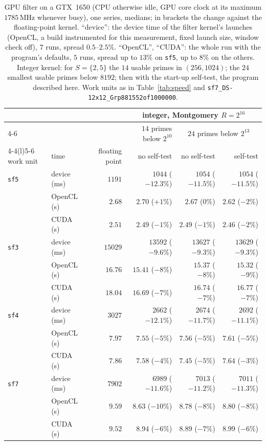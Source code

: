 \documentclass[10pt,a4paper]{article}
\newcommand{\code}[1]{\texttt{#1}}
\theoremstyle{plain}
\theoremstyle{definition}
\begin{document}
\begin{table}[ht]
\centering\footnotesize\setlength{\tabcolsep}{4pt}
\caption{GPU filter on a GTX~1650 (CPU otherwise idle, GPU core clock at its maximum $1785$\,MHz whenever busy), one series, medians; in brackets the change against
the floating-point kernel.  ``device'': the device time of the filter kernel's launches (OpenCL, a build instrumented for this measurement, fixed launch size,
window check off), $7$ runs, spread $0.5$--$2.5\%$.  ``OpenCL'', ``CUDA'': the whole run with the program's defaults, $5$ runs, spread up to $13\%$ on \code{sf5}, up to
$8\%$ on the others.  Integer kernel: for $S=\{2,5\}$ the $14$ usable primes in $(256,1024)$; the $24$ smallest usable primes below $8192$; then with the start-up
self-test, the program described here.  Work units as in Table~\ref{tab:speed} and \code{sf7\_DS-12x12\_Grp881552of1000000}.}\label{tab:gpuspeed}
\begin{tabular}{@{}llrrrr@{}}
\toprule
& & & \multicolumn{3}{c}{integer, Montgomery $R=2^{16}$} \\ \cmidrule(l){4-6}
& & & $14$ primes below $2^{10}$ & \multicolumn{2}{c}{$24$ primes below $2^{13}$} \\ \cmidrule(lr){4-4}\cmidrule(l){5-6}
work unit & time & floating point & no self-test & no self-test & self-test \\ \midrule
\code{sf5} & device (ms) & $1191$  & $1044$ ($-12.3\%$)  & $1054$ ($-11.5\%$)  & $1054$ ($-11.5\%$) \\
           & OpenCL (s)  & $2.68$  & $2.70$ ($+1\%$)     & $2.67$ ($0\%$)      & $2.62$ ($-2\%$) \\
           & CUDA (s)    & $2.51$  & $2.49$ ($-1\%$)     & $2.49$ ($-1\%$)     & $2.46$ ($-2\%$) \\
\code{sf3} & device (ms) & $15029$ & $13592$ ($-9.6\%$)  & $13627$ ($-9.3\%$)  & $13629$ ($-9.3\%$) \\
           & OpenCL (s)  & $16.76$ & $15.41$ ($-8\%$)    & $15.37$ ($-8\%$)    & $15.32$ ($-9\%$) \\
           & CUDA (s)    & $18.04$ & $16.69$ ($-7\%$)    & $16.74$ ($-7\%$)    & $16.77$ ($-7\%$) \\
\code{sf4} & device (ms) & $3027$  & $2662$ ($-12.1\%$)  & $2674$ ($-11.7\%$)  & $2692$ ($-11.1\%$) \\
           & OpenCL (s)  & $7.97$  & $7.55$ ($-5\%$)     & $7.56$ ($-5\%$)     & $7.61$ ($-5\%$) \\
           & CUDA (s)    & $7.86$  & $7.58$ ($-4\%$)     & $7.45$ ($-5\%$)     & $7.64$ ($-3\%$) \\
\code{sf7} & device (ms) & $7902$  & $6989$ ($-11.6\%$)  & $7013$ ($-11.2\%$)  & $7011$ ($-11.3\%$) \\
           & OpenCL (s)  & $9.59$  & $8.63$ ($-10\%$)    & $8.78$ ($-8\%$)     & $8.80$ ($-8\%$) \\
           & CUDA (s)    & $9.52$  & $8.94$ ($-6\%$)     & $8.89$ ($-7\%$)     & $8.99$ ($-6\%$) \\ \bottomrule
\end{tabular}
\end{table}
\end{document}
